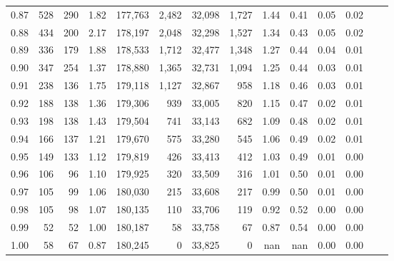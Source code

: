 \begin{tabular}{rrrrrrrrrrrrrr}
0.87 &    528 &  290 &    1.82 &  177,763 &    2,482 &  32,098 &   1,727 &  1.44 &  0.41 &  0.05 &      0.02 \\
0.88 &    434 &  200 &    2.17 &  178,197 &    2,048 &  32,298 &   1,527 &  1.34 &  0.43 &  0.05 &      0.02 \\
0.89 &    336 &  179 &    1.88 &  178,533 &    1,712 &  32,477 &   1,348 &  1.27 &  0.44 &  0.04 &      0.01 \\
0.90 &    347 &  254 &    1.37 &  178,880 &    1,365 &  32,731 &   1,094 &  1.25 &  0.44 &  0.03 &      0.01 \\
0.91 &    238 &  136 &    1.75 &  179,118 &    1,127 &  32,867 &     958 &  1.18 &  0.46 &  0.03 &      0.01 \\
0.92 &    188 &  138 &    1.36 &  179,306 &      939 &  33,005 &     820 &  1.15 &  0.47 &  0.02 &      0.01 \\
0.93 &    198 &  138 &    1.43 &  179,504 &      741 &  33,143 &     682 &  1.09 &  0.48 &  0.02 &      0.01 \\
0.94 &    166 &  137 &    1.21 &  179,670 &      575 &  33,280 &     545 &  1.06 &  0.49 &  0.02 &      0.01 \\
0.95 &    149 &  133 &    1.12 &  179,819 &      426 &  33,413 &     412 &  1.03 &  0.49 &  0.01 &      0.00 \\
0.96 &    106 &   96 &    1.10 &  179,925 &      320 &  33,509 &     316 &  1.01 &  0.50 &  0.01 &      0.00 \\
0.97 &    105 &   99 &    1.06 &  180,030 &      215 &  33,608 &     217 &  0.99 &  0.50 &  0.01 &      0.00 \\
0.98 &    105 &   98 &    1.07 &  180,135 &      110 &  33,706 &     119 &  0.92 &  0.52 &  0.00 &      0.00 \\
0.99 &     52 &   52 &    1.00 &  180,187 &       58 &  33,758 &      67 &  0.87 &  0.54 &  0.00 &      0.00 \\
1.00 &     58 &   67 &    0.87 &  180,245 &        0 &  33,825 &       0 &   nan &   nan &  0.00 &      0.00 \\
\bottomrule
\end{tabular}
